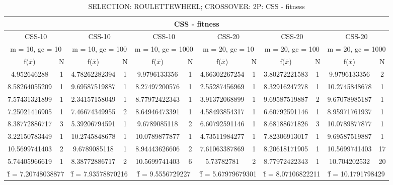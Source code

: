 \begin{table}[H]
	\centering
	\caption{SELECTION: ROULETTEWHEEL; CROSSOVER: 2P: CSS - fitness}
	\begin{adjustbox}{width=1\textwidth}
		\begin{tabular}{ |c|c||c|c||c|c||c|c||c|c||c|c| }
			\hline
			\multicolumn{12}{|c|}{CSS - fitness} \\
			\hline
			\multicolumn{2}{|c||}{CSS-10} & \multicolumn{2}{c||}{CSS-10} & \multicolumn{2}{c||}{CSS-10} & \multicolumn{2}{c||}{CSS-20} & \multicolumn{2}{c||}{CSS-20} & \multicolumn{2}{c|}{CSS-20}\\
			\hline
			\multicolumn{2}{|c||}{m = 10, gc = 10} & \multicolumn{2}{c||}{m = 10, gc = 100} & \multicolumn{2}{c||}{m = 10, gc = 1000} & \multicolumn{2}{c||}{m = 20, gc = 10} & \multicolumn{2}{c||}{m = 20, gc = 100} & \multicolumn{2}{c|}{m = 20, gc = 1000}\\
			\hline
			f($\bar{x}$) & N & f($\bar{x}$) & N & f($\bar{x}$) & N & f($\bar{x}$) & N & f($\bar{x}$) & N & f($\bar{x}$) & N\\
			\hline
			\hline
			4.952646288 & 1 & 4.78262282394 & 1 & 9.9796133356 & 1 & 4.66302267254 & 1 & 3.80272221583 & 1 & 9.9796133356 & 2\\
			8.58264055209 & 1 & 9.69587519887 & 1 & 8.27497200576 & 1 & 2.55287456969 & 1 & 8.32916247278 & 1 & 10.2745848678 & 1\\
			7.57431321899 & 1 & 2.34157158049 & 1 & 8.77972422343 & 1 & 3.91372068899 & 1 & 9.69587519887 & 2 & 9.67078985187 & 1\\
			7.25021416905 & 1 & 7.46674349955 & 2 & 8.64946473391 & 1 & 4.58493854317 & 1 & 6.60792591146 & 1 & 8.95971761937 & 1\\
			8.38772886717 & 3 & 5.39206794591 & 1 & 9.6789085118 & 2 & 6.60792591146 & 1 & 8.68188671826 & 3 & 10.0789877877 & 1\\
			3.22150783449 & 1 & 10.2745848678 & 1 & 10.0789877877 & 1 & 4.73511984277 & 1 & 7.82306913017 & 1 & 9.69587519887 & 1\\
			10.5699741403 & 2 & 9.6789085118 & 1 & 8.94443626606 & 2 & 7.61063387869 & 1 & 8.20618171905 & 1 & 10.5699741403 & 17\\
			5.74405966619 & 1 & 8.38772886717 & 2 & 10.5699741403 & 6 & 5.73782781 & 2 & 8.77972422343 & 1 & 10.704202532 & 20\\
			\hline
			\multicolumn{2}{|c||}{\^{f} = 7.20748038877} & \multicolumn{2}{c||}{\^{f} = 7.93578870216} & \multicolumn{2}{c||}{\^{f} = 9.5556729227} & \multicolumn{2}{c||}{\^{f} = 5.67979679301} & \multicolumn{2}{c||}{\^{f} = 8.07106822211} & \multicolumn{2}{c|}{\^{f} = 10.1791798429}\\
			\hline
		\end{tabular}
	\end{adjustbox}
\end{table}
